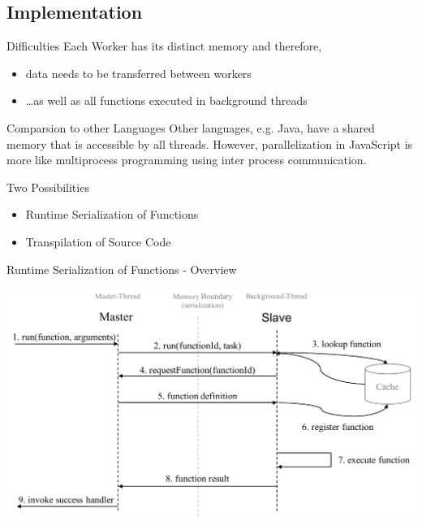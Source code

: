 \subsection{Implementation}

\begin{frame}{Difficulties}
	Each Worker has its distinct memory and therefore, 
	\begin{itemize}
		\item data needs to be transferred between workers
		\item \dots as well as all functions executed in background threads
	\end{itemize}
	
	\begin{block}{Comparsion to other Languages}
		Other languages, e.g. Java, have a shared memory that is accessible by all threads. However, 
			parallelization in JavaScript is more like multiprocess programming using inter process communication.
	\end{block}
\end{frame}

\begin{frame}{Two Possibilities}
	\begin{itemize}
		\item Runtime Serialization of Functions
		\item Transpilation of Source Code
	\end{itemize}
\end{frame}

\begin{frame}{Runtime Serialization of Functions - Overview}
	\begin{center}
		\includegraphics[width=1.0\textwidth]{runtime-system}
	\end{center}
\end{frame}

